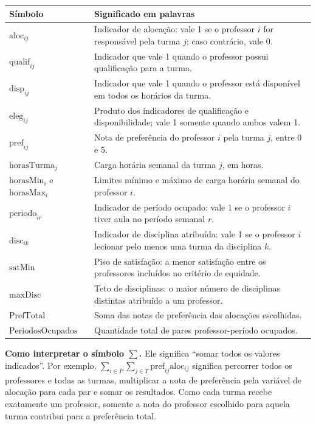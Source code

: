 \documentclass[11pt,a4paper]{article}
\begin{document}
\begin{center}
\small
\begin{tabular}{p{3.6cm}p{8.9cm}}
\toprule
\textbf{Símbolo} & \textbf{Significado em palavras} \\
\midrule
$\mathrm{aloc}_{ij}$ & Indicador de alocação: vale 1 se o professor $i$ for responsável pela turma $j$; caso contrário, vale 0. \\
$\mathrm{qualif}_{ij}$ & Indicador que vale 1 quando o professor possui qualificação para a turma. \\
$\mathrm{disp}_{ij}$ & Indicador que vale 1 quando o professor está disponível em todos os horários da turma. \\
$\mathrm{eleg}_{ij}$ & Produto dos indicadores de qualificação e disponibilidade; vale 1 somente quando ambos valem 1. \\
$\mathrm{pref}_{ij}$ & Nota de preferência do professor $i$ pela turma $j$, entre 0 e 5. \\
$\mathrm{horasTurma}_{j}$ & Carga horária semanal da turma $j$, em horas. \\
$\mathrm{horasMin}_{i}$ e $\mathrm{horasMax}_{i}$ & Limites mínimo e máximo de carga horária semanal do professor $i$. \\
$\mathrm{periodo}_{ir}$ & Indicador de período ocupado: vale 1 se o professor $i$ tiver aula no período semanal $r$. \\
$\mathrm{disc}_{ik}$ & Indicador de disciplina atribuída: vale 1 se o professor $i$ lecionar pelo menos uma turma da disciplina $k$. \\
$\mathrm{satMin}$ & Piso de satisfação: a menor satisfação entre os professores incluídos no critério de equidade. \\
$\mathrm{maxDisc}$ & Teto de disciplinas: o maior número de disciplinas distintas atribuído a um professor. \\
$\mathrm{PrefTotal}$ & Soma das notas de preferência das alocações escolhidas. \\
$\mathrm{PeriodosOcupados}$ & Quantidade total de pares professor-período ocupados. \\
\bottomrule
\end{tabular}
\end{center}

\noindent\textbf{Como interpretar o símbolo $\sum$.} Ele significa ``somar todos os valores indicados''. Por exemplo, $\sum_{i\in P}\sum_{j\in T}\mathrm{pref}_{ij}\mathrm{aloc}_{ij}$ significa percorrer todos os professores e todas as turmas, multiplicar a nota de preferência pela variável de alocação para cada par e somar os resultados. Como cada turma recebe exatamente um professor, somente a nota do professor escolhido para aquela turma contribui para a preferência total.
\end{document}
